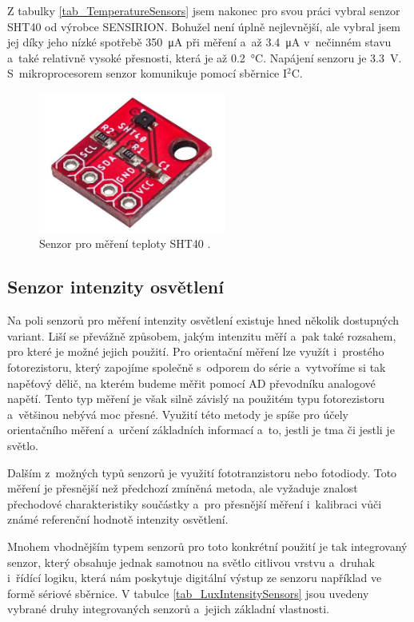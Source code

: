Z tabulky \ref{tab_TemperatureSensors} jsem nakonec pro svou práci vybral senzor SHT40 od výrobce SENSIRION. Bohužel není úplně nejlevnější, ale vybral jsem jej díky jeho nízké spotřebě \SI{350}{\micro\ampere} při měření a~až \SI{3,4}{\micro\ampere} v~nečinném stavu a~také relativně vysoké přesnosti, která je až \SI{0,2}{\celsius}. Napájení senzoru je \SI{3,3}{\volt}. S~mikroprocesorem senzor komunikuje pomocí sběrnice I$^2$C. 

\begin{figure}
    \centering
    \includegraphics[width=0.55\textwidth]{obrazky/sht40.jpg}
    \caption[Senzor pro měření teploty SHT40.]{Senzor pro měření teploty SHT40 \cite{SHT40}.}
    \label{fig_SHT40}
\end{figure}

\subsection{Senzor intenzity osvětlení}

Na poli senzorů pro měření intenzity osvětlení existuje hned několik dostupných variant. Liší se převážně způsobem, jakým intenzitu měří a~pak také rozsahem, pro které je možné jejich použití. Pro orientační měření lze využít i~prostého fotorezistoru, který zapojíme společně s~odporem do série a~vytvoříme si tak napěťový dělič, na kterém budeme měřit pomocí AD převodníku analogové napětí. Tento typ měření je však silně závislý na použitém typu fotorezistoru a~většinou nebývá moc přesné. Využití této metody je spíše pro účely orientačního měření a~určení základních informací a~to, jestli je tma či jestli je světlo. 

Dalším z~možných typů senzorů je využití fototranzistoru nebo fotodiody. Toto měření je přesnější než předchozí zmíněná metoda, ale vyžaduje znalost přechodové charakteristiky součástky a~pro přesnější měření i~kalibraci vůči známé referenční hodnotě intenzity osvětlení.

Mnohem vhodnějším typem senzorů pro toto konkrétní použití je tak integrovaný senzor, který obsahuje jednak samotnou na světlo citlivou vrstvu a~druhak i~řídící logiku, která nám poskytuje digitální výstup ze senzoru například ve formě sériové sběrnice. V tabulce \ref{tab_LuxIntensitySensors} jsou uvedeny vybrané druhy integrovaných senzorů a~jejich základní vlastnosti.

